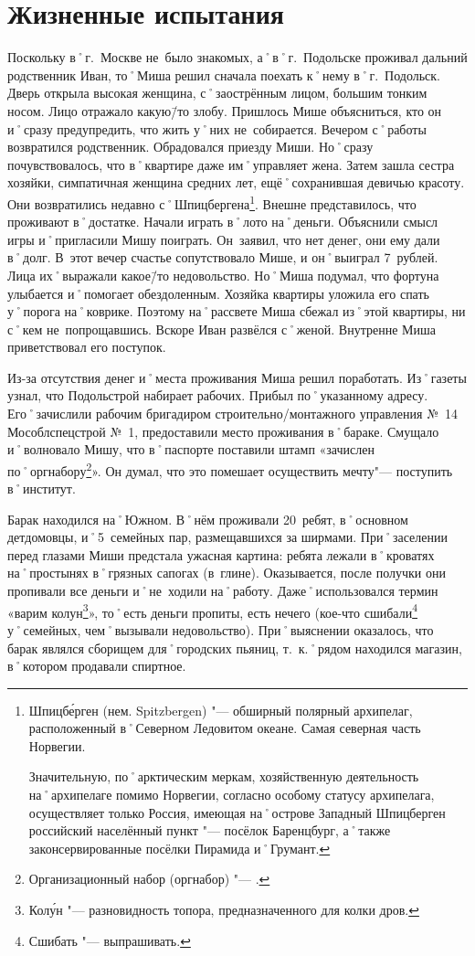 ﻿\chapter{Жизненные испытания}

Поскольку в˚г.~Москве не~было знакомых, а˚в˚г.~Подольске проживал дальний родственник Иван, то˚Миша решил сначала поехать к˚нему в˚г.~Подольск. Дверь открыла высокая женщина, с˚заострённым лицом, большим тонким носом. Лицо отражало какую\=/то злобу. Пришлось Мише объясниться, кто он и˚сразу предупредить, что жить у˚них не~собирается. Вечером с˚работы возвратился родственник. Обрадовался приезду Миши. Но˚сразу почувствовалось, что в˚квартире даже им˚управляет жена. Затем зашла сестра хозяйки, симпатичная женщина средних лет, ещё˚сохранившая девичью красоту. Они возвратились недавно с˚Шпицбергена\footnote{Шпицб\'{е}рген (нем. Spitzbergen) "--- обширный полярный архипелаг, расположенный в˚Северном Ледовитом океане. Самая северная часть Норвегии. 

Значительную, по˚арктическим меркам, хозяйственную деятельность на˚архипелаге помимо Норвегии, согласно особому статусу архипелага, осуществляет только Россия, имеющая на˚острове Западный Шпицберген российский населённый пункт "--- посёлок Баренцбург, а˚также законсервированные посёлки Пирамида и˚Грумант.}. 
Внешне представилось, что проживают в˚достатке. Начали играть в˚лото на˚деньги. Объяснили смысл игры и˚пригласили Мишу поиграть. Он~заявил, что нет денег, они ему дали в˚долг. В~этот вечер счастье сопутствовало Мише, и он˚выиграл 7~рублей. Лица их˚выражали какое\=/то недовольство. Но˚Миша подумал, что фортуна улыбается и˚помогает обездоленным. Хозяйка квартиры уложила его спать у˚порога на˚коврике. Поэтому на˚рассвете Миша сбежал из˚этой квартиры, ни с˚кем не~попрощавшись. Вскоре Иван развёлся с˚женой. Внутренне Миша приветствовал его поступок.

Из-за отсутствия денег и˚места проживания Миша решил поработать. Из˚газеты узнал, что Подольстрой набирает рабочих. Прибыл по˚указанному адресу. Его˚зачислили рабочим бригадиром строительно\-/монтажного управления №~14 Мособлспецстрой №~1, предоставили место проживания в˚бараке. Смущало и˚волновало Мишу, что в˚паспорте поставили штамп «зачислен по˚оргнабору\footnote{Организационный набор (оргнабор) "--- .}». Он думал, что это помешает осуществить мечту"--- поступить в˚институт.

Барак находился на˚Южном. В˚нём проживали 20~ребят, в˚основном детдомовцы, и˚5~семейных пар, размещавшихся за ширмами. При˚заселении перед глазами Миши предстала ужасная картина: ребята лежали в˚кроватях на˚простынях в˚грязных сапогах (в~глине). Оказывается, после получки они пропивали все деньги и˚не~ходили на˚работу. Даже˚использовался термин «варим колун\footnote{Кол\'{у}н "--- разновидность топора, предназначенного для колки дров.}», то˚есть деньги пропиты, есть нечего (кое-что сшибали\footnote{Сшибать "--- выпрашивать.} у˚семейных, чем˚вызывали недовольство). При˚выяснении оказалось, что барак являлся сборищем для˚городских пьяниц, т.~к.˚рядом находился магазин, в˚котором продавали спиртное. 

